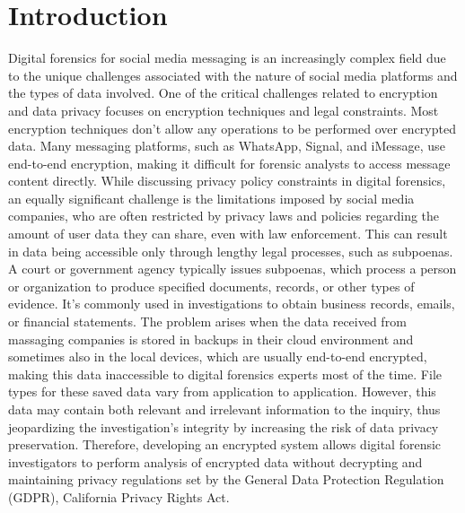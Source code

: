 \documentclass[conference]{IEEEtran}
\begin{document}
\section{Introduction}
Digital forensics for social media messaging is an increasingly complex field due to the unique challenges associated with the nature of social media platforms and the types of data involved. One of the critical challenges related to encryption and data privacy focuses on encryption techniques and legal constraints. Most encryption techniques don’t allow any operations to be performed over encrypted data. Many messaging platforms, such as WhatsApp, Signal, and iMessage, use end-to-end encryption, making it difficult for forensic analysts to access message content directly. While discussing privacy policy constraints in digital forensics, an equally significant challenge is the limitations imposed by social media companies, who are often restricted by privacy laws and policies regarding the amount of user data they can share, even with law enforcement. This can result in data being accessible only through lengthy legal processes, such as subpoenas. A court or government agency typically issues subpoenas, which process a person or organization to produce specified documents, records, or other types of evidence. It’s commonly used in investigations to obtain business records, emails, or financial statements. The problem arises when the data received from massaging companies is stored in backups in their cloud environment and sometimes also in the local devices, which are usually end-to-end encrypted, making this data inaccessible to digital forensics experts most of the time. File types for these saved data vary from application to application. However, this data may contain both relevant and irrelevant information to the inquiry, thus jeopardizing the investigation's integrity by increasing the risk of data privacy preservation. Therefore, developing an encrypted system allows digital forensic investigators to perform analysis of encrypted data without decrypting and maintaining privacy regulations set by the General Data Protection Regulation (GDPR), California Privacy Rights Act.
\end{document}

